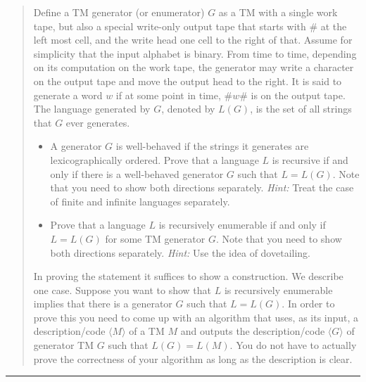 \documentclass[11pt]{article}
\begin{document}

\begin{quote}
Define a TM generator (or enumerator) $G$ as a TM with a single
  work tape, but also a special write-only output tape that starts
  with $\#$ at the left most cell, and the write head one cell to the
  right of that.  Assume for simplicity that the input alphabet is
  binary.  From time to time, depending on its computation on the work
  tape, the generator may write a character on the output tape and
  move the output head to the right.  It is said to generate a word
  $w$ if at some point in time, $\#w\#$ is on the output tape. The
  language generated by $G$, denoted by $L(G)$, is the set of all
  strings that $G$ ever generates.
  \begin{itemize}
  \item A generator $G$ is well-behaved if the strings it generates
    are lexicographically ordered. Prove that a language $L$ is
    recursive if and only if there is a well-behaved generator $G$ such
    that $L=L(G)$. Note that you need
    to show both directions separately. {\em Hint:} Treat the case of finite and
    infinite languages separately.

  \item Prove that a language $L$ is recursively enumerable if and
    only if $L = L(G)$ for some TM generator $G$. Note that you need
    to show both directions separately. {\em Hint:} Use the idea of
    dovetailing.
  \end{itemize}
  In proving the statement it suffices to show a construction. We
  describe one case. Suppose you want to show that $L$ is recursively
  enumerable implies that there is a generator $G$ such that
  $L = L(G)$. In order to prove this you need to come up with an
  algorithm that uses, as its input, a description/code
  $\langle M \rangle$ of a TM $M$ and outputs the description/code
  $\langle G \rangle$ of generator TM $G$ such that $L(G) = L(M)$.  You
  do not have to actually prove the correctness of your algorithm as long as
  the description is clear.
\end{quote}
\hrule
\end{document}
